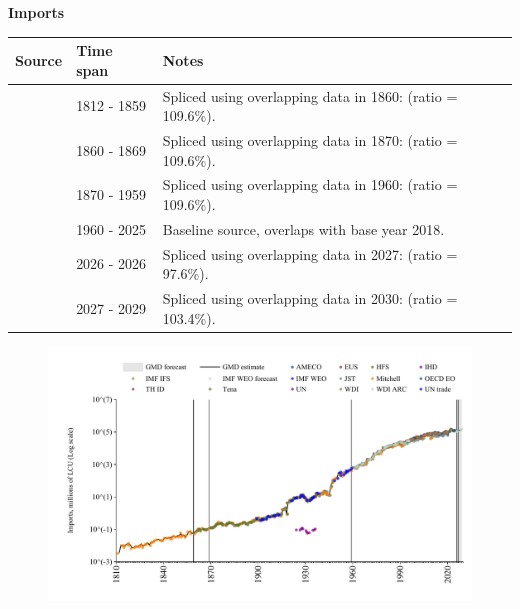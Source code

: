 \documentclass[12pt,a4paper,landscape]{article}
\begin{document}
\begin{adjustbox}{max totalsize={\paperwidth}{\paperheight},center}
\begin{minipage}[t][\textheight][t]{\textwidth}
\vspace*{0.5cm}
{}
\begin{center}
{\Large\bfseries Imports}
\end{center}
\vspace{0.5cm}
\begin{table}[H]
\centering
\small
\begin{tabular}{|l|l|l|}
\hline
\textbf{Source} & \textbf{Time span} & \textbf{Notes} \\
\hline
\rowcolor{white}\cite{Mitchell}& 1812 - 1859 &Spliced using overlapping data in 1860: (ratio = 109.6\%). \\
\rowcolor{lightgray}\cite{Tena}& 1860 - 1869 &Spliced using overlapping data in 1870: (ratio = 109.6\%). \\
\rowcolor{white}\cite{JST}& 1870 - 1959 &Spliced using overlapping data in 1960: (ratio = 109.6\%). \\
\rowcolor{lightgray}\cite{OECD_EO}& 1960 - 2025 &Baseline source, overlaps with base year 2018. \\
\rowcolor{white}\cite{AMECO}& 2026 - 2026 &Spliced using overlapping data in 2027: (ratio = 97.6\%). \\
\rowcolor{lightgray}\cite{IMF_WEO_forecast}& 2027 - 2029 &Spliced using overlapping data in 2030: (ratio = 103.4\%). \\
\hline
\end{tabular}
\end{table}
\begin{figure}[H]
\centering
\includegraphics[width=\textwidth,height=0.6\textheight,keepaspectratio]{graphs/FIN_imports.pdf}
\end{figure}
\end{minipage}
\end{adjustbox}
\end{document}
